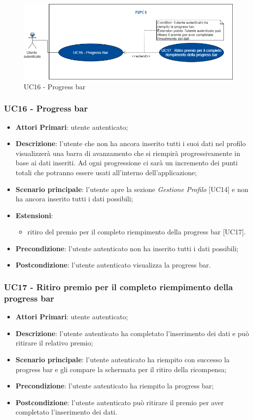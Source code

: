 \begin{figure}[h]
	\includegraphics[width=13cm]{res/images/Schemagenerale7.png}
	\centering
	\caption{UC16 - Progress bar}
\end{figure}
\subsubsection{UC16 - Progress bar}
\begin{itemize}
	\item \textbf{Attori Primari}: utente autenticato;
	\item \textbf{Descrizione}: l'utente che non ha ancora inserito tutti i suoi dati nel profilo visualizzerà una barra di avanzamento che si riempirà progressivamente in base ai dati inseriti. Ad ogni progressione ci sarà un incremento dei punti totali che potranno essere usati all'interno dell'applicazione;
	\item \textbf{Scenario principale}: l'utente apre la sezione \textit{Gestione Profilo} [UC14] e non ha ancora inserito tutti i dati possibili;
	\item \textbf{Estensioni}:
	\begin{itemize}
		\item ritiro del premio per il completo riempimento della progress bar [UC17].
	\end{itemize}
	\item \textbf{Precondizione}: l'utente autenticato non ha inserito tutti i dati possibili;
	\item \textbf{Postcondizione}: l'utente autenticato visualizza la progress bar.
\end{itemize}

\subsubsection{UC17 - Ritiro premio per il completo riempimento della progress bar}
\begin{itemize}
	\item \textbf{Attori Primari}: utente autenticato;
	\item \textbf{Descrizione}: l'utente autenticato ha completato l'inserimento dei dati e può ritirare il relativo premio;	
	\item \textbf{Scenario principale}: l'utente autenticato ha riempito con successo la progress bar e gli compare la schermata per il ritiro della ricompensa;
	\item \textbf{Precondizione}: l'utente autenticato ha riempito la progress bar;
	\item \textbf{Postcondizione}: l'utente autenticato può ritirare il premio per aver completato l'inserimento dei dati.
\end{itemize}
